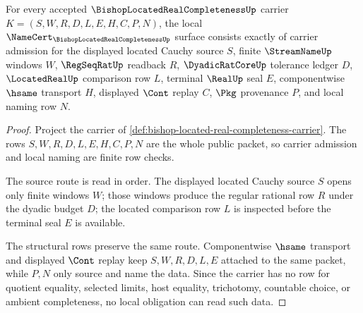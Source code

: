 \begin{theorem}
\label{thm:bishop-located-real-completeness-namecert-obligations}
For every accepted $\BishopLocatedRealCompletenessUp$ carrier $K=(S,W,R,D,L,E,H,C,P,N)$, the local $\NameCert_{\BishopLocatedRealCompletenessUp}$ surface consists exactly of carrier admission for the displayed located Cauchy source $S$, finite $\StreamNameUp$ windows $W$, $\RegSeqRatUp$ readback $R$, $\DyadicRatCoreUp$ tolerance ledger $D$, $\LocatedRealUp$ comparison row $L$, terminal $\RealUp$ seal $E$, componentwise $\hsame$ transport $H$, displayed $\Cont$ replay $C$, $\Pkg$ provenance $P$, and local naming row $N$.
\end{theorem}
\begin{proof}
Project the carrier of \autoref{def:bishop-located-real-completeness-carrier}. The rows $S,W,R,D,L,E,H,C,P,N$ are the whole public packet, so carrier admission and local naming are finite row checks.

The source route is read in order. The displayed located Cauchy source $S$ opens only finite windows $W$; those windows produce the regular rational row $R$ under the dyadic budget $D$; the located comparison row $L$ is inspected before the terminal seal $E$ is available.

The structural rows preserve the same route. Componentwise $\hsame$ transport and displayed $\Cont$ replay keep $S,W,R,D,L,E$ attached to the same packet, while $P,N$ only source and name the data. Since the carrier has no row for quotient equality, selected limits, host equality, trichotomy, countable choice, or ambient completeness, no local obligation can read such data.
\end{proof}


\begin{closurestatus}{\BishopLocatedRealCompletenessUp}
  \theoryclosure{\seedClosure}
  \formalstatus{\unformalizedV}
\end{closurestatus}
